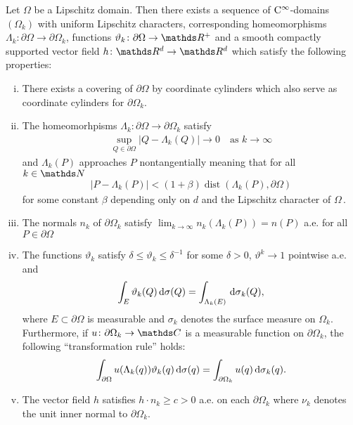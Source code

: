 \begin{thm}[Ne\v{c}as, Verchota]
  \label{thm:smoothApproximation}
  Let $\Omega$ be a Lipschitz domain.
  Then there exists a sequence of $\mathrm{C}^\infty$-domains $(\Omega_k)$ with uniform Lipschitz characters, corresponding homeomorphisms $\Lambda_k \colon \partial\Omega \to \partial\Omega_k$, functions $\vartheta_k \colon \partial\Omega \to \R^+$ and a smooth compactly supported vector field $h \colon \R^d \to \R^d$ which satisfy the following properties:
  \begin{enumerate}[i)]
    \item There exists a covering of $\partial\Omega$ by coordinate cylinders which also serve as coordinate cylinders for $\partial\Omega_k$.
    \item The homeomorhpisms $\Lambda_k \colon \partial \Omega \to \partial\Omega_k$ satisfy
      \begin{align*}
        \sup_{Q \in \partial\Omega} |Q - \Lambda_k(Q)| \to 0\quad\text{as } k \to \infty
      \end{align*}
      and $\Lambda_k(P)$ approaches $P$ nontangentially meaning that for all $k \in \N$
      \begin{align*}
        | P - \Lambda_k(P) | < (1 + \beta) \operatorname{dist}(\Lambda_k(P), \partial\Omega)
      \end{align*}
      for some constant $\beta$ depending only on $d$ and the Lipschitz character of $\Omega\,$.
    \item The normals $n_k$ of $\partial\Omega_k$ satisfy $\lim_{k \to \infty} n_k(\Lambda_k(P)) = n(P)$ a.e. for all $P \in \partial\Omega$
    \item The functions $\vartheta_k$ satisfy $\delta \leq \vartheta_k \leq \delta^{-1}$ for some $\delta > 0$, $\vartheta^k \to 1$ pointwise a.e. and
      \begin{align*}
        \int_E \vartheta_k(Q) \, {\operatorname{d}\!{\sigma}}(Q) = \int_{\Lambda_k(E)} \, {\operatorname{d}\!{\sigma}}_k(Q),
      \end{align*}
      where $E \subset \partial \Omega$ is measurable and $\sigma_k$ denotes the surface measure on $\Omega_k$.
      Furthermore, if $u \colon \partial\Omega_k \to \C$ is a measurable function on $\partial\Omega_k$, the following ``transformation rule'' holds:
      \begin{align*}
         \int_{\partial\Omega} u(\Lambda_k(q)) \vartheta_k(q) \, {\operatorname{d}\!{\sigma}}(q) = \int_{\partial\Omega_k} u(q) \, {\operatorname{d}\!{\sigma}}_k(q) .
      \end{align*}
    \item The vector field $h$ satisfies $h \cdot  n_k \geq c > 0$ a.e. on each $\partial\Omega_k$ where $\nu_k$ denotes the unit inner normal to $\partial\Omega_k$.
  \end{enumerate}
\end{thm}

